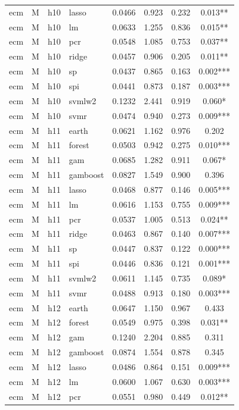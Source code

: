 \begin{ThreePartTable}
\begin{longtable}[t]{llclcccc}
ecm & M & h10 & lasso & 0.0466 & 0.923 & 0.232 & 0.013**\\
ecm & M & h10 & lm & 0.0633 & 1.255 & 0.836 & 0.015**\\
ecm & M & h10 & pcr & 0.0548 & 1.085 & 0.753 & 0.037**\\
ecm & M & h10 & ridge & 0.0457 & 0.906 & 0.205 & 0.011**\\
ecm & M & h10 & sp & 0.0437 & 0.865 & 0.163 & 0.002***\\
ecm & M & h10 & spi & 0.0441 & 0.873 & 0.187 & 0.003***\\
ecm & M & h10 & svmlw2 & 0.1232 & 2.441 & 0.919 & 0.060*\\
ecm & M & h10 & svmr & 0.0474 & 0.940 & 0.273 & 0.009***\\
\addlinespace
ecm & M & h11 & earth & 0.0621 & 1.162 & 0.976 & 0.202\\
ecm & M & h11 & forest & 0.0503 & 0.942 & 0.275 & 0.010***\\
ecm & M & h11 & gam & 0.0685 & 1.282 & 0.911 & 0.067*\\
ecm & M & h11 & gamboost & 0.0827 & 1.549 & 0.900 & 0.396\\
ecm & M & h11 & lasso & 0.0468 & 0.877 & 0.146 & 0.005***\\
ecm & M & h11 & lm & 0.0616 & 1.153 & 0.755 & 0.009***\\
ecm & M & h11 & pcr & 0.0537 & 1.005 & 0.513 & 0.024**\\
ecm & M & h11 & ridge & 0.0463 & 0.867 & 0.140 & 0.007***\\
ecm & M & h11 & sp & 0.0447 & 0.837 & 0.122 & 0.000***\\
ecm & M & h11 & spi & 0.0446 & 0.836 & 0.121 & 0.001***\\
ecm & M & h11 & svmlw2 & 0.0611 & 1.145 & 0.735 & 0.089*\\
ecm & M & h11 & svmr & 0.0488 & 0.913 & 0.180 & 0.003***\\
\addlinespace
ecm & M & h12 & earth & 0.0647 & 1.150 & 0.967 & 0.433\\
ecm & M & h12 & forest & 0.0549 & 0.975 & 0.398 & 0.031**\\
ecm & M & h12 & gam & 0.1240 & 2.204 & 0.885 & 0.311\\
ecm & M & h12 & gamboost & 0.0874 & 1.554 & 0.878 & 0.345\\
ecm & M & h12 & lasso & 0.0486 & 0.864 & 0.151 & 0.009***\\
ecm & M & h12 & lm & 0.0600 & 1.067 & 0.630 & 0.003***\\
ecm & M & h12 & pcr & 0.0551 & 0.980 & 0.449 & 0.012**\\

\end{longtable}
\end{ThreePartTable}
